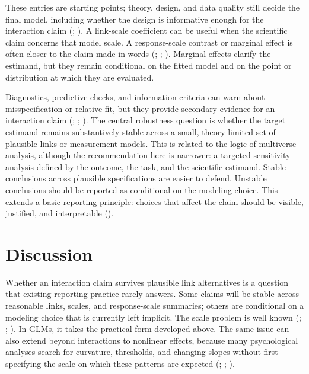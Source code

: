 \documentclass[
  man,
  longtable,
  nolmodern,
  notxfonts,
  notimes,
  colorlinks=true,linkcolor=blue,citecolor=blue,urlcolor=blue]{apa7}
\begin{document}
These entries are starting points; theory, design, and data quality
still decide the final model, including whether the design is
informative enough for the interaction claim
(;
). A link-scale
coefficient can be useful when the scientific claim concerns that model
scale. A response-scale contrast or marginal effect is often closer to
the claim made in words (;
; ). Marginal effects clarify the estimand, but they
remain conditional on the fitted model and on the point or distribution
at which they are evaluated.

Diagnostics, predictive checks, and information criteria can warn about
misspecification or relative fit, but they provide secondary evidence
for an interaction claim (; ;
). The central robustness
question is whether the target estimand remains substantively stable
across a small, theory-limited set of plausible links or measurement
models. This is related to the logic of multiverse analysis, although
the recommendation here is narrower: a targeted sensitivity analysis
defined by the outcome, the task, and the scientific estimand. Stable
conclusions across plausible specifications are easier to defend.
Unstable conclusions should be reported as conditional on the modeling
choice. This extends a basic reporting principle: choices that affect
the claim should be visible, justified, and interpretable
().

\section{Discussion}\label{discussion}

Whether an interaction claim survives plausible link alternatives is a
question that existing reporting practice rarely answers. Some claims
will be stable across reasonable links, scales, and response-scale
summaries; others are conditional on a modeling choice that is currently
left implicit. The scale problem is well known
(; ; ). In
GLMs, it takes the practical form developed above. The same issue can
also extend beyond interactions to nonlinear effects, because many
psychological analyses search for curvature, thresholds, and changing
slopes without first specifying the scale on which these patterns are
expected (;
;
).
\end{document}
